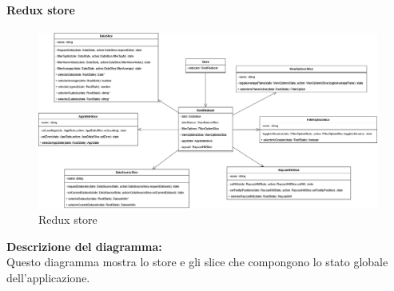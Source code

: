 \paragraph{Redux store}
\begin{figure}[h!] \centering
    \includegraphics[scale=0.3]{template/images/uml_front/logic/store.png}
    \caption{Redux store}
\end{figure}
\textbf{Descrizione del diagramma:}\\
Questo diagramma mostra lo store e gli slice che compongono lo stato globale dell'applicazione.
